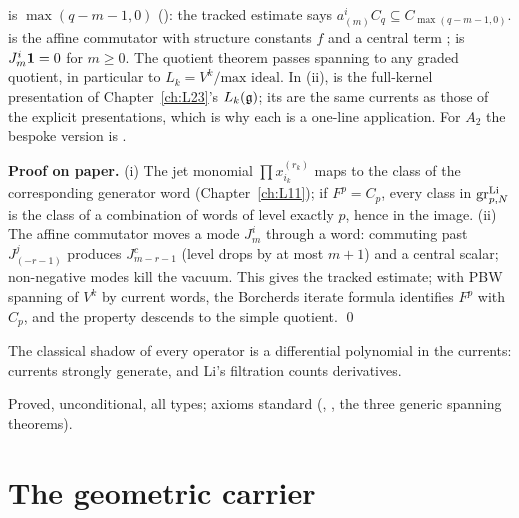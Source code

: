 \begin{dictionary}
 is $\max(q-m-1,0)$ (): the tracked
estimate says $a^i_{(m)}C_q\subseteq C_{\max(q-m-1,0)}$.  is the affine commutator with structure
constants $f$ and a central term ;  is $J^i_m\mathbf 1=0$ for $m\ge0$. The quotient
theorem passes spanning to any graded quotient, in particular to $L_k=V^k/\text{max ideal}$. In (ii),
 is the full-kernel presentation of Chapter~\ref{ch:L23}'s $L_k(\mathfrak g)$;
its  are the same currents as those of the explicit presentations, which is why each
 is a one-line application. For $A_2$ the bespoke version is
.
\end{dictionary}

\textbf{Proof on paper.} (i) The jet monomial $\prod x_{i_k}^{(r_k)}$ maps to the class of the corresponding
generator word (Chapter~\ref{ch:L11}); if $F^p=C_p$, every class in $\operatorname{gr}^{\mathrm{Li}}_{p,N}$ is the class of a
combination of words of level exactly $p$, hence in the image. (ii) The affine commutator moves a mode
$J^i_m$ through a word: commuting past $J^j_{(-r-1)}$ produces $J^c_{m-r-1}$ (level drops by at most $m+1$)
and a central scalar; non-negative modes kill the vacuum. This gives the tracked estimate; with PBW
spanning of $V^k$ by current words, the Borcherds iterate formula identifies $F^p$ with $C_p$, and the
property descends to the simple quotient. \qed

\begin{physics}
The classical shadow of every operator is a differential polynomial in the currents: currents strongly
generate, and Li's filtration counts derivatives.
\end{physics}

\begin{status}
Proved, unconditional, all types; axioms standard (,
, the three generic spanning theorems).
\end{status}

\section{The geometric carrier}\label{l24:sec:carrier}

